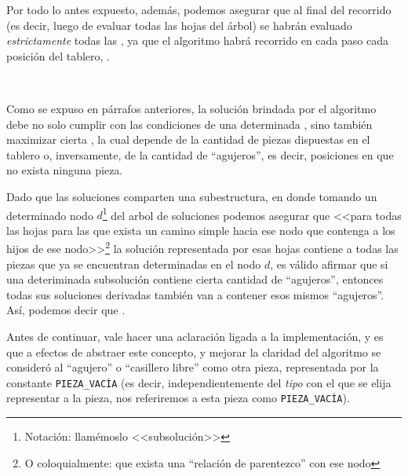 \documentclass[11pt, a4paper, twoside]{article}
\begin{document}
\begin{paragraph}
Por todo lo antes expuesto, además, podemos asegurar que al final del
recorrido (es decir, luego de evaluar todas las hojas del árbol) se habrán
evaluado \emph{estrictamente} todas las \textbf{},
ya que el algoritmo habrá recorrido en cada paso cada posición del tablero,
\textbf{}.

\end{paragraph}

\begin{paragraph}\


Como se expuso en párrafos anteriores, la solución brindada por el algoritmo
debe no solo cumplir con las condiciones de una determinada , sino también maximizar cierta , la cual depende de la cantidad de piezas dispuestas
en el tablero o, inversamente, de la cantidad de ``agujeros'', es decir,
posiciones en que no exista ninguna pieza.

Dado que las soluciones comparten una subestructura, en donde tomando un
determinado nodo $d$\footnote{Notación: llamémoslo <<subsolución>>} del arbol
de soluciones podemos asegurar que <<para todas las hojas para las que exista
un camino simple hacia ese nodo que contenga a los hijos de ese
nodo>>\footnote{O coloquialmente: que exista una ``relación de parentezco''
con ese nodo} la solución representada por esas hojas contiene a todas las
piezas que ya se encuentran determinadas en el nodo $d$, es válido afirmar que
si una deteriminada subsolución contiene cierta cantidad de ``agujeros'',
entonces todas sus soluciones derivadas también van a contener esos mismos
``agujeros''. Así, podemos decir que \emph{}.

\begin{aclaracion}

Antes de continuar, vale hacer una aclaración ligada a la implementación, y es
que a efectos de abstraer este concepto, y mejorar la claridad del algoritmo
se consideró al ``agujero'' o ``casillero libre'' como otra pieza,
representada por la constante \texttt{PIEZA\_VACÍA} (es decir,
independientemente del \emph{tipo} con el que se elija representar a la pieza,
nos referiremos a esta pieza como \texttt{PIEZA\_VACÍA}).

\end{aclaracion}


\end{paragraph}
\end{document}

